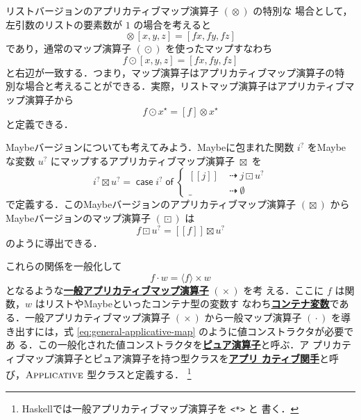 \documentclass[a5paper,twoside,fleqn,draft]{jsbook}
\def\[{[\![}
\def\]{]\!]}
\newcommand{\programminglanguage}[1]{\textsf{#1}}
\newcommand{\haskell}{\programminglanguage{Haskell}}
\newcommand{\keyword}[1]{{\underline{\textbf{#1}}}}
\newcommand{\code}[1]{\texttt{#1}}
\newcommand{\mKeyword}[1]{\mathsf{#1}}
\newcommand{\mIfKeyword}{\mKeyword{if}}
\newcommand{\mCaseKeyword}{\mKeyword{case}}
\newcommand{\mOfKeyword}{\mKeyword{of}}
\newcommand{\mOtherwiseKeyword}{\mKeyword{otherwise}}
\DeclareMathOperator{\mCaseKW}{\mCaseKeyword}
\DeclareMathOperator{\mIf}{\mIfKeyword}
\DeclareMathOperator{\mOfKW}{\mOfKeyword}
\DeclareMathOperator{\mOtherwise}{\mOtherwiseKeyword}
\newcommand{\mNothing}{\emptyset}
\DeclareMathOperator{\mAppMap}{\times}
\DeclareMathOperator{\mAppMapList}{\otimes}
\DeclareMathOperator{\mAppMapMaybe}{\boxtimes}
\DeclareMathOperator{\mIfSo}{\dashrightarrow}
\DeclareMathOperator{\mLogicalAnd}{\wedge}
\DeclareMathOperator{\mMap}{\cdot}
\DeclareMathOperator{\mMapList}{\odot}
\DeclareMathOperator{\mMapMaybe}{\boxdot}
\newcommand{\mValueConstructor}[1]{\mathrm{#1}}
\newcommand{\mValueWith}[2]{{}^\mValueConstructor{#1}\[#2\]}
\newcommand{\mJustWith}[1]{\[#1\]}%
\newcommand{\mPureWith}[1]{\langle#1\rangle}
\newcommand{\mTypeClass}[1]{\textsc{#1}} %
\newcommand{\mApplicativeTypeClass}{\mTypeClass{Applicative}}
\newcommand{\mList}[1]{{#1}^\mathrm{\star}}
\newcommand{\mMaybe}[1]{{#1}^?}
\newcommand{\mCaseOf}[1]{\mCaseKW#1\mOfKW}
\begin{document}
リストバージョンのアプリカティブマップ演算子 $(\mAppMapList)$ の特別な
場合として，左引数のリストの要素数が $1$ の場合を考えると
\begin{equation}
  [f]\mAppMapList{}[x,y,z]
  =[fx,fy,fz]
\end{equation}
であり，通常のマップ演算子 $(\mMapList)$ を使ったマップすなわち
\begin{equation}
  f\mMapList{}[x,y,z]
  =[fx,fy,fz]
\end{equation}
と右辺が一致する．つまり，マップ演算子はアプリカティブマップ演算子の特
別な場合と考えることができる．実際，リストマップ演算子はアプリカティブマップ演算子から
\begin{equation}
  f\mMapList\mList{x}
  =[f]\mAppMapList\mList{x}
\end{equation}
と定義できる．

Maybeバージョンについても考えてみよう．Maybeに包まれた関数 $\mMaybe{i}$
をMaybeな変数 $\mMaybe{u}$ にマップするアプリカティブマップ演算子
$\mAppMapMaybe$ を
\begin{equation}
  \mMaybe{i}\mAppMapMaybe\mMaybe{u}
  =\mCaseOf{\mMaybe{i}}
  \begin{cases}
    \mJustWith{j}
    &\mIfSo j\mMapMaybe\mMaybe{u}\\
    \_
    &\mIfSo\mNothing
  \end{cases}
\end{equation}
で定義する．このMaybeバージョンのアプリカティブマップ演算子
$(\mAppMapMaybe)$ からMaybeバージョンのマップ演算子 $(\mMapMaybe)$ は
\begin{equation}
  f\mMapMaybe\mMaybe{u}
  =\mJustWith{f}\mAppMapMaybe\mMaybe{u}
\end{equation}
のように導出できる．

これらの関係を一般化して
\begin{equation}
  \label{eq:general-applicative-map}
  f\mMap w
  =\mPureWith{f}\mAppMap w
\end{equation}
となるような\keyword{一般アプリカティブマップ演算子} $(\mAppMap)$ を考
える．ここに $f$ は関数，$w$ はリストやMaybeといったコンテナ型の変数す
なわち\keyword{コンテナ変数}である．一般アプリカティブマップ演算子
$(\mAppMap)$ から一般マップ演算子 $(\mMap)$ を導き出すには，式
\eqref{eq:general-applicative-map} のように値コンストラクタが必要であ
る．この一般化された値コンストラクタを\keyword{ピュア演算子}と呼ぶ．ア
プリカティブマップ演算子とピュア演算子を持つ型クラスを\keyword{アプリ
  カティブ関手}と呼び，$\mApplicativeTypeClass$ 型クラスと定義する．
\footnote{\haskell では一般アプリカティブマップ演算子を \code{<*>} と
  書く．}
\end{document}
